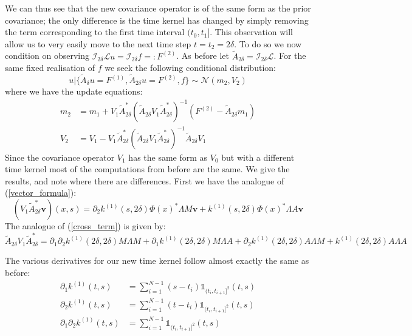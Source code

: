 \documentclass{article}
\theoremstyle{definition}
\theoremstyle{remark}
\theoremstyle{remark}
\begin{document}
\noindent We can thus see that the new covariance operator is of the same form as the prior covariance; the only difference is the time kernel has changed by simply removing the term corresponding to the first time interval $(t_0,t_1]$. This observation will allow us to very easily move to the next time step $t=t_2=2\delta$. To do so we now condition on observing $\mathcal{I}_{2\delta}\mathcal{L}u=\mathcal{I}_{2\delta}f=:F^{(2)}$. As before let $\tilde{A}_{2\delta}=\mathcal{I}_{2\delta}\mathcal{L}$. For the same fixed realisation of $f$ we seek the following conditional distribution:
\begin{equation}
  u|\{\tilde{A}_{\delta}u=F^{(1)},\tilde{A}_{2\delta}u=F^{(2)},f\}\sim\mathcal{N}(m_{2},V_{2})
\end{equation}
where we have the update equations:
\begin{align}
    m_{2}&=m_{1}+V_{1}\tilde{A}_{2\delta}^{*}(\tilde{A}_{2\delta}V_{1}\tilde{A}_{2\delta}^{*})^{-1}(F^{(2)}-\tilde{A}_{2\delta}m_{1}) \\
    V_{2}&=V_{1}-V_{1}\tilde{A}_{2\delta}^{*}(\tilde{A}_{2\delta}V_{1}\tilde{A}_{2\delta}^{*})^{-1}\tilde{A}_{2\delta}V_{1}
\end{align}
Since the covariance operator $V_1$ has the same form as $V_0$ but with a different time kernel most of the computations from before are the same. We give the results, and note where there are differences. First we have the analogue of (\ref{vector_formula}):
\begin{equation}
  \label{vector_formula_2}
  (V_{1}\tilde{A}_{2\delta}^{*}\boldsymbol{v})(x,s) = \partial_{2}k^{(1)}(s,2\delta)\Phi(x)^{*}\Lambda M\boldsymbol{v} + k^{(1)}(s,2\delta)\Phi(x)^{*}\Lambda A \boldsymbol{v}
\end{equation}
The analogue of (\ref{cross_term}) is given by:
\begin{equation}
  \label{cross_term_2}
  \tilde{A}_{2\delta}V_{1}\tilde{A}_{2\delta}^{*}=\partial_{1}\partial_{2}k^{(1)}(2\delta,2\delta)M\Lambda M + \partial_{1}k^{(1)}(2\delta,2\delta)M\Lambda A + \partial_{2}k^{(1)}(2\delta,2\delta)A\Lambda M +  k^{(1)}(2\delta,2\delta)A\Lambda A
\end{equation}

\noindent The various derivatives for our new time kernel follow almost exactly the same as before:
\begin{align*}
    \partial_{1}k^{(1)}(t,s) &= \sum_{i=1}^{N-1}(s-t_{i})\mathbb{1}_{(t_{i},t_{i+1}]^{2}}(t,s) \\
    \partial_{2}k^{(1)}(t,s) &= \sum_{i=1}^{N-1}(t-t_{i})\mathbb{1}_{(t_{i},t_{i+1}]^{2}}(t,s) \\
    \partial_{1}\partial_{2}k^{(1)}(t,s) &= \sum_{i=1}^{N-1}\mathbb{1}_{(t_{i},t_{i+1}]^{2}}(t,s)
\end{align*}
\end{document}
